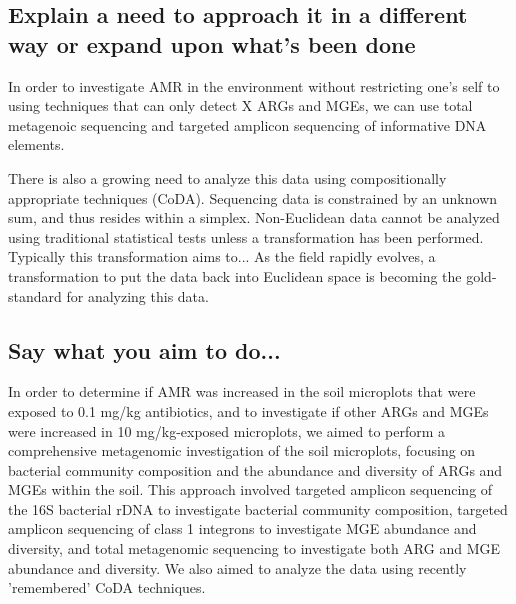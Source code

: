 \subsection{Explain a need to approach it in a different way or expand upon what's been done}

In order to investigate AMR in the environment without restricting one's self to using techniques that can only detect X ARGs and MGEs, we can use total metagenoic sequencing and targeted amplicon sequencing of informative DNA elements.

There is also a growing need to analyze this data using compositionally appropriate techniques (CoDA).
Sequencing data is constrained by an unknown sum, and thus resides within a simplex.
Non-Euclidean data cannot be analyzed using traditional statistical tests unless a transformation has been performed.
Typically this transformation aims to...
As the field rapidly evolves, a transformation to put the data back into Euclidean space is becoming the gold-standard for analyzing this data.

\subsection{Say what you aim to do...}

In order to determine if AMR was increased in the soil microplots that were exposed to 0.1 mg/kg antibiotics, and to investigate if other ARGs and MGEs were increased in 10 mg/kg-exposed microplots, we aimed to perform a comprehensive metagenomic investigation of the soil microplots, focusing on bacterial community composition and the abundance and diversity of ARGs and MGEs within the soil.
This approach involved targeted amplicon sequencing of the 16S bacterial rDNA to investigate bacterial community composition, targeted amplicon sequencing of class 1 integrons to investigate MGE abundance and diversity, and total metagenomic sequencing to investigate both ARG and MGE abundance and diversity.
We also aimed to analyze the data using recently 'remembered' CoDA techniques.
